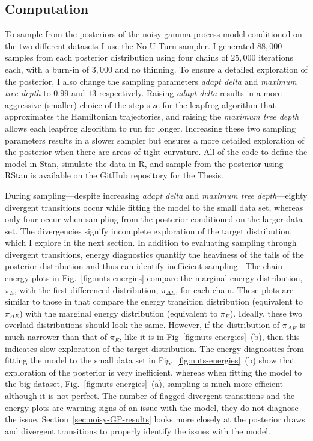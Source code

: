 \subsection{Computation}

To sample from the posteriors of the noisy gamma process model conditioned on the two different datasets I use the No-U-Turn sampler. I generated $88,000$ samples from each posterior distribution using four chains of $25,000$ iterations each, with a burn-in of $3,000$ and no thinning. To ensure a detailed exploration of the posterior, I also change the sampling parameters \textit{adapt delta} and \textit{maximum tree depth} to $0.99$ and $13$ respectively. Raising \textit{adapt delta} results in a more aggressive (smaller) choice of the step size for the leapfrog algorithm that approximates the Hamiltonian trajectories, and raising the \textit{maximum tree depth} allows each leapfrog algorithm to run for longer. Increasing these two sampling parameters results in a slower sampler but ensures a more detailed exploration of the posterior when there are areas of tight curvature. All of the code to define the model in Stan, simulate the data in R, and sample from the posterior using RStan is available on the GitHub repository for the Thesis.

During sampling---despite increasing \textit{adapt delta} and \textit{maximum tree depth}---eighty divergent transitions occur while fitting the model to the small data set, whereas only four occur when sampling from the posterior conditioned on the larger data set. The divergencies signify incomplete exploration of the target distribution, which I explore in the next section. In addition to evaluating sampling through divergent transitions, energy diagnostics quantify the heaviness of the tails of the posterior distribution and thus can identify inefficient sampling \citep{bayesplot}. The chain energy plots in Fig.~\ref{fig:nuts-energies} compare the marginal energy distribution, $\pi_E$, with the first differenced distribution, $\pi_{\Delta E}$, for each chain. These plots are similar to those in \citet{betancourt_2017} that compare the energy transition distribution (equivalent to $\pi_{\Delta E}$) with the marginal energy distribution (equivalent to $\pi_E$). Ideally, these two overlaid distributions should look the same. However, if the distribution of $\pi_{\Delta E}$ is much narrower than that of $\pi_E$, like it is in Fig~\ref{fig:nuts-energies}~(b), then this indicates slow exploration of the target distribution. The energy diagnostics from fitting the model to the small data set in Fig.~\ref{fig:nuts-energies}~(b) show that exploration of the posterior is very inefficient, whereas when fitting the model to the big dataset, Fig.~\ref{fig:nuts-energies}~(a), sampling is much more efficient---although it is not perfect. The number of flagged divergent transitions and the energy plots are warning signs of an issue with the model, they do not diagnose the issue. Section~\ref{sec:noisy-GP-results} looks more closely at the posterior draws and divergent transitions to properly identify the issues with the model.

